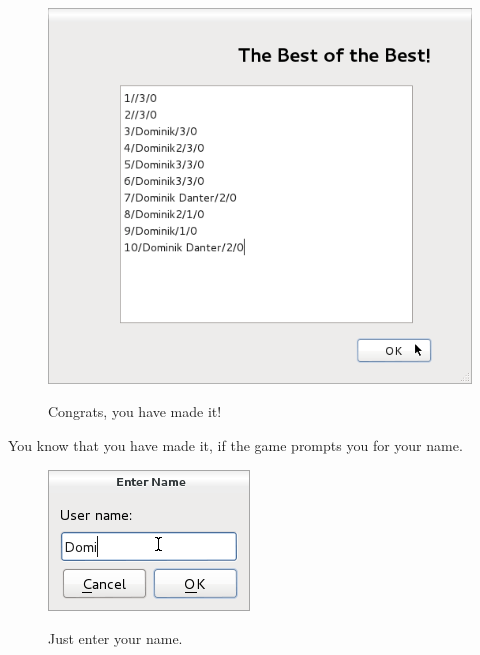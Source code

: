 \documentclass[a4paper,11pt]{article}
\begin{document}
\begin{figure}[H]
  \begin{center}
    \includegraphics{img/highScore.png}
    \label{fig:}
    \caption{Congrats, you have made it!}
  \end{center}
\end{figure}

You know that you have made it, if the game prompts you for your name.
\begin{figure}[H]
  \begin{center}
    \includegraphics{img/enterName.png}
    \label{fig:}
    \caption{Just enter your name.}
  \end{center}
\end{figure}
\end{document}
